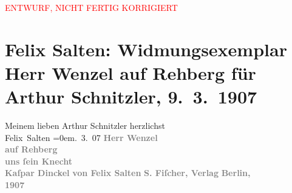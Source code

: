 
\begin{center}
            \textcolor{red}{ENTWURF, NICHT FERTIG KORRIGIERT}
                      \end{center}
            
         \renewcommand{\erwaehnteInstitutionen}{Institutionen: S. Fischer Verlag}
         \renewcommand{\erwaehnteOrte}{Orte: Berlin, Wien}
         \renewcommand{\erwaehnteWerke}{Werke: Herr Wenzel auf Rehberg und sein Knecht Kaspar Dinckel}
               \section[Felix Salten: Widmungsexemplar Herr Wenzel auf Rehberg für Arthur Schnitzler, 9. 3. 1907]{ Felix Salten: Widmungsexemplar Herr Wenzel auf Rehberg für Arthur
               Schnitzler, 9. 3. 1907}\nopagebreak{}\rehead{ }\begin{ledgroupsized}[t]{13cm}\normalsize\beginnumbering \toendnotes[C]{\smallbreak\pagebreak[2]} 
\pstart
           \noindent{}{\pb}Meinem lieben Arthur Schnitzler\pend
           \pstart
           herzlichst{\\[\baselineskip]}\spacefill\mbox{Felix Salten}\pend
           \leftskip=0em{}. 3. 07\pend
           {\bigskip}\pstart
           \noindent{}\centering{}\textcolor{gray}{\textbf{Herr Wenzel{\\}auf Rehberg{\\}uns ſein
                     Knecht{\\}Kaſpar Dinckel}}\pend
           \pstart
           \noindent{}\centering{}\textcolor{gray}{\textbf{von Felix Salten}}\pend
           {\bigskip}\pstart
           \noindent{}\centering{}\textcolor{gray}{\textbf{S. Fiſcher, Verlag}}\pend
           \pstart
           \noindent{}\centering{}\textcolor{gray}{\textbf{Berlin,}}{\\}\textcolor{gray}{\textbf{1907}}\pend
           
         
         \endnumbering{}\end{ledgroupsized}\begin{anhang}\end{anhang}\newcommand{\dateiname}{L03046}\newcommand{\titel}{Felix Salten: Widmungsexemplar Herr Wenzel auf Rehberg für Arthur Schnitzler, 9. 3. 1907}\newcommand{\editorInnen}{Martin Anton Müller und Laura Untner}
      